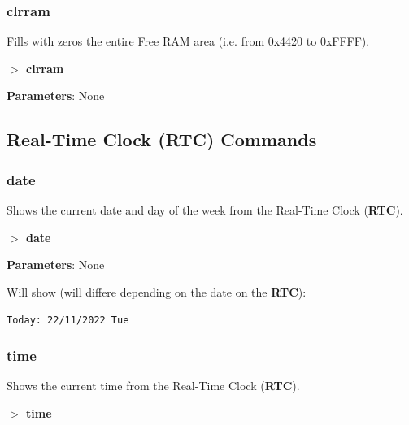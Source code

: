 \documentclass[a4paper,11pt]{article}
\begin{document}
        \subsubsection{{\color{blue}clrram}}
        Fills with zeros the entire Free RAM area (i.e. from 0x4420 to
        0xFFFF).

        \hspace{1.9cm}\textbf{$>$ clrram}

        \textbf{Parameters}: None

    \subsection{Real-Time Clock (RTC) Commands}
        \subsubsection{{\color{blue}date}}
        Shows the current date and day of the week from the Real-Time Clock
        (\textbf{RTC}).

        \hspace{1.9cm}\textbf{$>$ date}

        \textbf{Parameters}: None

        Will show (will differe depending on the date on the \textbf{RTC}):

        \hspace{1cm}\texttt{Today:\ 22/11/2022 Tue}

        \subsubsection{{\color{blue}time}}
        Shows the current time from the Real-Time Clock (\textbf{RTC}).

        \hspace{1.9cm}\textbf{$>$ time}
\end{document}

